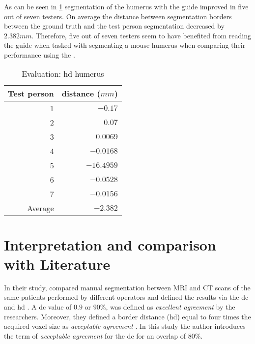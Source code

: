 \noindent
As can be seen in \cref{tab:humerus-distance} segmentation of the humerus with the guide improved in five out of seven testers.
On average the distance between segmentation borders between the ground truth and the test person segmentation decreased by $2.382mm$.
Therefore, five out of seven testers seem to have benefited from reading the guide when tasked with segmenting a mouse humerus when comparing their performance using the .
\begin{table}[ht]
	\begin{center}
		\begin{tabular}{r r}
			\textbf{Test person} & \textbf{distance ($mm$)} \\
			\hline
			1                    & $-0.17$                  \\
			2                    & $0.07$                   \\
			3                    & $0.0069$                 \\
			4                    & $-0.0168$                \\
			5                    & $-16.4959$               \\
			6                    & $-0.0528$                \\
			7                    & $-0.0156$                \\
			\hline
			Average              & $-2.382$                 \\
		\end{tabular}
		\caption{Evaluation: \acrshort{hd} humerus}\label{tab:humerus-distance}
	\end{center}
\end{table}

\section{Interpretation and comparison with Literature}
In their study, \citeauthor{andersenAccuracyPrecisionManual2018} compared manual segmentation between MRI and CT scans of the same patients performed by
different operators and defined the results via the \acrfull{dc} and \acrfull{hd} \cite{andersenAccuracyPrecisionManual2018}.
A \acrshort{dc} value of $0.9$ or $90\%$, was defined as \textit{excellent agreement} by the researchers.
Moreover, they defined a border distance (\acrshort{hd}) equal to four times the acquired voxel size
as \textit{acceptable agreement} \cite{andersenAccuracyPrecisionManual2018}.
In this study the author introduces the term of \textit{acceptable agreement} for the \acrshort{dc} for an overlap of $80\%$.

